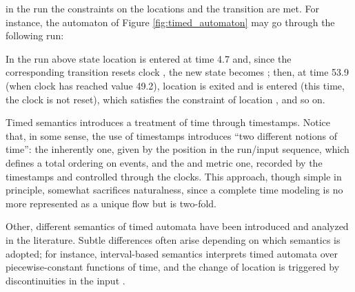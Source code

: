 in the run the constraints on the locations and the transition 
are met. For instance, the automaton of Figure \ref{fig:timed_automaton} may go through 
the following run:

In the run above state location  is entered at time 4.7 
and, since the corresponding transition resets clock , the 
new state becomes ; then, at time 
53.9 (when clock  has reached value 49.2), location 
is exited and  is entered (this time, the clock  
is not reset), which satisfies the constraint 
of location , and so on.

Timed semantics introduces a  treatment of time through 
timestamps. Notice that, in some sense, the use of timestamps 
introduces ``two different notions of time'': the inherently  
one, given by the position  in the run/input sequence, which 
defines a total ordering on events, and the  and metric 
one, recorded by the timestamps and controlled through the clocks. 
This approach, though simple in principle, somewhat sacrifices 
naturalness, since a complete time modeling is no more represented 
as a unique flow but is two-fold.

Other, different semantics of timed automata have been introduced 
and analyzed in the literature. Subtle differences often arise 
depending on which semantics is adopted; for instance, interval-based 
semantics interprets timed automata over piecewise-constant functions 
of time, and the change of location is triggered by discontinuities 
in the input \cite{AFH96,ACM02,Asa04}.

